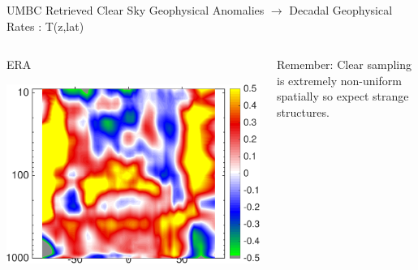 \documentclass[10pt,t]{beamer}
\begin{document}


\begin{frame}{UMBC Retrieved Clear Sky Geophysical Anomalies $\rightarrow$ Decadal Geophysical Rates : T(z,lat)}
\vspace{-0.35in}

\begin{columns}
\begin{column}{0.45\columnwidth}
\begin{block}{\footnotesize ERA}
\vspace{-0.1in}
\begin{center}
\includegraphics[width=0.95\linewidth]{Figs/ClearAnom/rawERAtzrates.png}
\end{center}
\end{block}
\end{column}

\begin{column}{0.45\columnwidth}
  \begin{block}
    
Remember: Clear sampling is extremely non-uniform spatially so expect strange structures.
\end{block}
\end{column}
\end{columns}

\vspace{-0.25in}


\end{frame}
\end{document}
